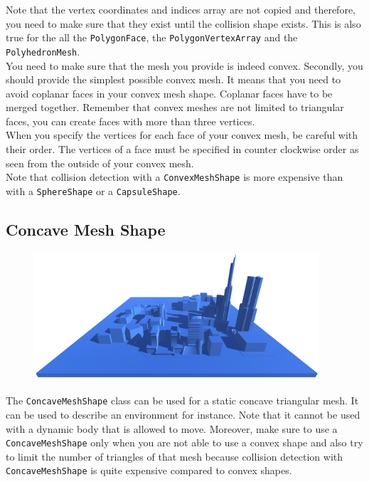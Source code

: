 \documentclass[a4paper,12pt]{article}
\begin{document}
    \vspace{0.6cm}

    Note that the vertex coordinates and indices array are not copied and therefore, you need to make sure that they exist until the collision shape exists. This is also true for
    the all the \texttt{PolygonFace}, the \texttt{PolygonVertexArray} and the \texttt{PolyhedronMesh}. \\

    You need to make sure that the mesh you provide is indeed convex. Secondly, you should provide the simplest possible convex mesh. It means that you need to avoid
    coplanar faces in your convex mesh shape. Coplanar faces have to be merged together. Remember that convex meshes are not limited to triangular faces, you can
    create faces with more than three vertices. \\

    When you specify the vertices for each face of your convex mesh, be careful with their order. The vertices of a face must be specified in counter clockwise order
    as seen from the outside of your convex mesh. \\

    Note that collision detection with a \texttt{ConvexMeshShape} is more expensive than with a \texttt{SphereShape} or a \texttt{CapsuleShape}. \\

  \subsection{Concave Mesh Shape}

  \begin{figure}[h]
      \centering
      \includegraphics{concavemeshshape.png}
      \label{fig:concaveshape}
  \end{figure}

  The \texttt{ConcaveMeshShape} class can be used for a static concave triangular mesh. It can be used to describe an environment for
  instance. Note that it cannot be used with a dynamic body that is allowed to move. Moreover, make sure to use a \texttt{ConcaveMeshShape} only
  when you are not able to use a convex shape and also try to limit the number of triangles of that mesh because collision detection
  with \texttt{ConcaveMeshShape} is quite expensive compared to convex shapes. \\
\end{document}

